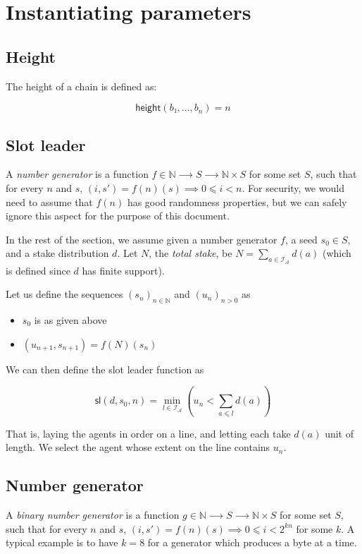\documentclass{article}
\newcommand{\idsof}[1]{\mathcal{I}\!_#1}
\newcommand{\agentids}{\idsof{\mathcal{A}}}
\newcommand{\slotleader}[3]{\mathsf{sl}(#1,#2,#3)}
\newcommand{\height}[1]{\mathsf{height}(#1)}
\begin{document}
\section{Instantiating parameters}
\label{sec:params}

\subsection{Height}
\label{sec:height}

The height of a chain is defined as:

$$
\height{b₁,…,b_n} = n
$$

\subsection{Slot leader}
\label{sec:slot-leader}

A \emph{number generator} is a function $f ∈ ℕ ⟶ S ⟶ ℕ×S$ for some set
$S$, such that for every $n$ and $s$, $(i,s') = f(n)(s) ⟹ 0 ⩽ i <
n$. For security, we would need to assume that $f(n)$ has good
randomness properties, but we can safely ignore this aspect for the
purpose of this document.

In the rest of the section, we assume given a number generator $f$, a
seed $s_0∈S$, and a stake distribution $d$. Let $N$, the \emph{total
  stake}, be $N=∑_{a∈\agentids} d(a)$ (which is defined since $d$ has
finite support).

Let us define the sequences $(s_n)_{n∈ℕ}$ and $(u_n)_{n>0}$ as
\begin{itemize}
\item $s_0$ is as given above
\item $(u_{n+1}, s_{n+1}) = f(N)(s_n)$
\end{itemize}

We can then define the slot leader function as

$$
\slotleader{d}{s_0}{n} = \min_{l∈\agentids} \left( u_n < ∑_{a⩽l} d(a) \right)
$$

That is, laying the agents in order on a line, and letting each take
$d(a)$ unit of length. We select the agent whose extent on the line
contains $u_n$.

\subsection{Number generator}
\label{sec:number-generator}

A \emph{binary number generator} is a function $g ∈ ℕ ⟶ S ⟶ ℕ×S$ for
some set $S$, such that for every $n$ and $s$,
$(i,s') = f(n)(s) ⟹ 0 ⩽ i < 2^{kn}$ for some $k$. A typical example is
to have $k=8$ for a generator which produces a byte at a time.
\end{document}
